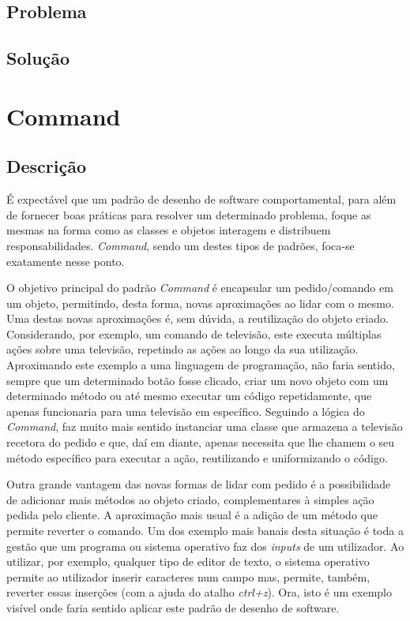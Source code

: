 \documentclass[10pt,portuguese]{article}
\begin{document}
\subsection{Problema}
\subsection{Solução}

\clearpage

\section{Command}
\subsection{Descrição}

\par É expectável que um padrão de desenho de software comportamental, para além de fornecer boas práticas para resolver um determinado problema, foque as mesmas na forma como as classes e objetos interagem e distribuem responsabilidades. \textit{Command}, sendo um destes tipos de padrões, foca-se exatamente nesse ponto.

\par O objetivo principal do padrão \textit{Command} é encapsular um pedido/comando em um objeto, permitindo, desta forma, novas aproximações ao lidar com o mesmo. Uma destas novas aproximações é, sem dúvida, a reutilização do objeto criado. Considerando, por exemplo, um comando de televisão, este executa múltiplas ações sobre uma televisão, repetindo as ações ao longo da sua utilização. Aproximando este exemplo a uma linguagem de programação, não faria sentido, sempre que um determinado botão fosse clicado, criar um novo objeto com um determinado método ou até mesmo executar um código repetidamente, que apenas funcionaria para uma televisão em específico. 
Seguindo a lógica do \textit{Command}, faz muito mais sentido instanciar uma classe que armazena a televisão recetora do pedido e que, daí em diante, apenas necessita que lhe chamem o seu método específico para executar a ação, reutilizando e uniformizando o código. 

\par Outra grande vantagem das novas formas de lidar com pedido é a possibilidade de adicionar mais métodos ao objeto criado, complementares à simples ação pedida pelo cliente. A aproximação mais usual é a adição de um método que permite reverter o comando. Um dos exemplo mais banais desta situação é toda a gestão que um programa ou sistema operativo faz dos \textit{inputs} de um utilizador. 
Ao utilizar, por exemplo, qualquer tipo de editor de texto, o sistema operativo permite ao utilizador inserir caracteres num campo mas, permite, também, reverter essas inserções (com a ajuda do atalho \textit{ctrl+z}). Ora, isto é um exemplo visível onde faria sentido aplicar este padrão de desenho de software.
\end{document}
